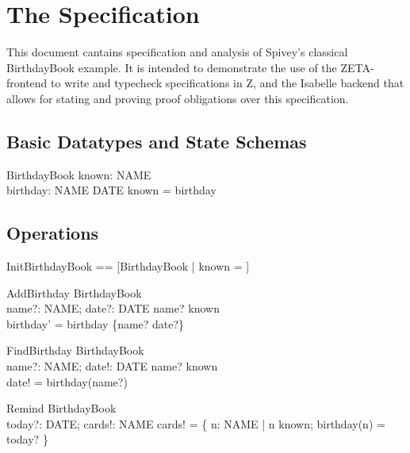 
\section{The Specification}

This document cantains specification and analysis of Spivey's 
classical BirthdayBook example. It is intended to demonstrate
the use of the ZETA-frontend to write and typecheck
specifications in Z, and the Isabelle backend that allows for
stating and proving proof obligations over this specification.

\subsection{Basic Datatypes and State Schemas}

\begin{zedgroup}
  \begin{zed}
  \end{zed}

  \begin{schema}{BirthdayBook}
    known: \power NAME \\
    birthday: NAME \pfun DATE
    \where
    known = \dom birthday
  \end{schema}
\end{zedgroup}

\subsection{Operations}
\begin{zed}
 InitBirthdayBook == [BirthdayBook | known = \emptyset] 
\end{zed}

\begin{zedgroup}
  \begin{schema}{AddBirthday}
    \Delta BirthdayBook \\
    name?: NAME; date?: DATE
    \where
    name? \notin known \\
    birthday' = birthday \cup \{name? \mapsto date?\}
  \end{schema}
  \begin{schema}{FindBirthday}
    \Xi BirthdayBook \\
    name?: NAME; date!: DATE 
    \where
    name? \in known \\
    date! = birthday(name?)
  \end{schema}
  \begin{schema}{Remind}
    \Xi BirthdayBook \\
    today?: DATE; cards!: \power NAME
    \where
    cards! = \{ n: NAME | n \in known; birthday(n) =  today? \}\\
  \end{schema}
\end{zedgroup}


